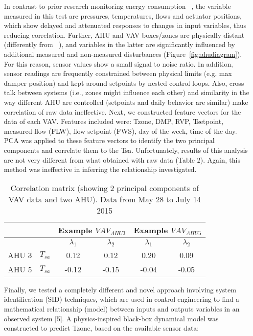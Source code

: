 In contrast to prior research monitoring energy consumption ~\cite{EMD}, the variable measured in this test are pressures, temperatures, flows and actuator positions, which show delayed and attenuated responses to changes in input variables, thus reducing correlation. Further, AHU and VAV boxes/zones are physically distant (differently from ~\cite{koc2014comparison}), and variables in the latter are significantly influenced by additional measured and non-measured disturbances (Figure~\ref{fig:ahudiagram}). For this reason, sensor values show a small signal to noise ratio. In addition, sensor readings are frequently constrained between physical limits (e.g. max damper position) and kept around setpoints by nested control loops. Also, cross-talk between systems (i.e., zones might influence each other) and similarity in the way different AHU are controlled (setpoints and daily behavior are similar) make correlation of raw data ineffective.
Next, we constructed feature vectors for the data of each VAV. Features included were: Tzone, DMP, RVP, Tsetpoint, measured flow (FLW), flow setpoint (FWS), day of the week, time of the day. PCA was applied to these feature vectors to identify the two principal components and correlate them to the Tsa. Unfortunately, results of this analysis are not very different from what obtained with raw data (Table 2). Again, this method was ineffective in inferring the relationship investigated.


\begin{table}[ht]\scriptsize
 \caption{ Correlation matrix (showing 2 principal components of VAV data and two AHU). Data from May 28 to July 14 2015}
 \label{tab:pca}
\begin{tabular*}{0.40\textwidth}{|c|c|c|c|c|c|}
\hline
\multicolumn{2}{|c|}{} & 
  \multicolumn{2}{|c|}{Example $VAV_{AHU3}$} & \multicolumn{2}{|c|}{Example $VAV_{AHU5}$} \\ \hline
\multicolumn{2}{|c|}{} & $\lambda_1$ & $\lambda_2$ & $\lambda_1$ &  $\lambda_2$ \\ \hline
AHU 3 & $T_{sa}$ & 0.12 & 0.12 & 0.20 & 0.09  \\ \hline
AHU 5  & $T_{sa}$ & -0.12 & -0.15 & -0.04 & -0.05  \\ \hline
\end{tabular*}
\end{table}


Finally, we tested a completely different and novel approach involving system identification (SID) techniques, which are used in control engineering to find a mathematical relationship (model) between inputs and outputs variables in an observed system [5]. A physics-inspired black-box dynamical model was constructed to predict Tzone, based on the available sensor data: \\

